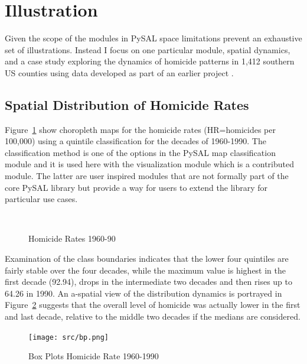 \documentclass[11pt, titlepage]{article}
\begin{document}
\section{Illustration}

Given the scope of the modules in PySAL space limitations prevent an
exhaustive set of illustrations. Instead I focus on one particular
module, spatial dynamics, and a case study exploring the dynamics of
homicide patterns in  1,412 southern US counties using data developed as part of an
earlier project \citep{Baller:2001aa, Messner:1999xz}.

\subsection{Spatial Distribution of Homicide Rates}

Figure~\ref{f:hr} show choropleth maps for the homicide rates (HR=homicides
per 100,000) using a quintile classification for the decades of 1960-1990. The classification method is
one of the options in the PySAL map classification module and it is used
here with the visualization module which is a contributed module. The
latter are user inspired modules that are not formally part of the core
PySAL library but provide a way for users to extend the library for
particular use cases.


\begin{figure}
  \centering
  \\
  \noindent
\caption[caption]{Homicide Rates 1960-90}
\label{f:hr}
\end{figure}


Examination of the class boundaries indicates that the lower four
quintiles are fairly stable over the four decades, while the maximum
value is highest in the first decade (92.94), drops in the intermediate two
decades and then rises up to 64.26 in 1990. An a-spatial view of the
distribution dynamics is portrayed in Figure~\ref{f:bp} suggests that the overall level
of homicide was actually lower in the first and last decade, relative to
the middle two decades if the medians are considered.


\begin{figure}[ht]
\begin{center}
\texttt{[image: src/bp.png]}
\end{center}
\caption{Box Plots Homicide Rate 1960-1990}
\label{f:bp}
\end{figure}   
\end{document}
